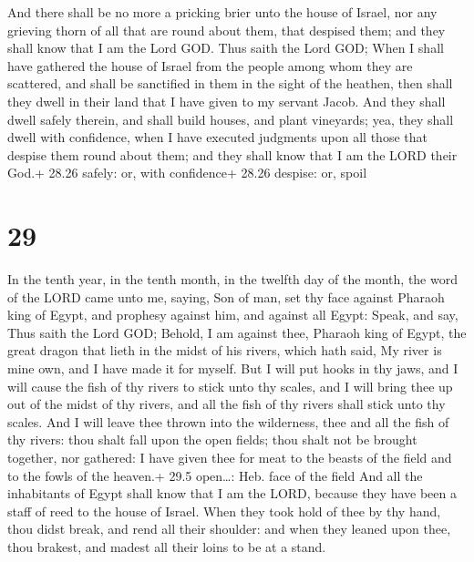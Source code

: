  And there shall be no more a pricking brier unto the
house of Israel, nor any grieving thorn of all that are round about
them, that despised them; and they shall know that I am the Lord GOD.
 Thus saith the Lord GOD; When I shall have gathered the
house of Israel from the people among whom they are scattered, and shall
be sanctified in them in the sight of the heathen, then shall they dwell
in their land that I have given to my servant Jacob.  And
they shall dwell safely therein, and shall build houses, and plant
vineyards; yea, they shall dwell with confidence, when I have executed
judgments upon all those that despise them round about them; and they
shall know that I am the LORD their God.+ 28.26 safely: or, with
confidence+ 28.26 despise: or, spoil

\hypertarget{section-28}{%
\section{29}\label{section-28}}

 In the tenth year, in the tenth month, in the twelfth day
of the month, the word of the LORD came unto me, saying, 
Son of man, set thy face against Pharaoh king of Egypt, and prophesy
against him, and against all Egypt:  Speak, and say, Thus
saith the Lord GOD; Behold, I am against thee, Pharaoh king of Egypt,
the great dragon that lieth in the midst of his rivers, which hath said,
My river is mine own, and I have made it for myself.  But I
will put hooks in thy jaws, and I will cause the fish of thy rivers to
stick unto thy scales, and I will bring thee up out of the midst of thy
rivers, and all the fish of thy rivers shall stick unto thy scales.
 And I will leave thee thrown into the wilderness, thee and
all the fish of thy rivers: thou shalt fall upon the open fields; thou
shalt not be brought together, nor gathered: I have given thee for meat
to the beasts of the field and to the fowls of the heaven.+ 29.5
open\ldots: Heb. face of the field  And all the inhabitants
of Egypt shall know that I am the LORD, because they have been a staff
of reed to the house of Israel.  When they took hold of thee
by thy hand, thou didst break, and rend all their shoulder: and when
they leaned upon thee, thou brakest, and madest all their loins to be at
a stand.

